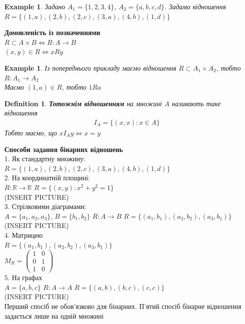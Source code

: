 \documentclass[a4paper, 14pt]{extarticle}
\theoremstyle{theoremdd}
\theoremstyle{theoremdd}
\newtheorem{definition}[theorem]{Definition}
\theoremstyle{theoremdd}
\theoremstyle{theoremdd}
\newtheorem{example}[theorem]{Example}
\theoremstyle{theoremdd}
\theoremstyle{theoremdd}
\theoremstyle{theoremdd}
\theoremstyle{theoremdd}
\begin{document}
\begin{example}
Задано $A_1 = \{1,2,3,4\}$, $A_2 = \{a,b,c,d\}$. Задамо відношення\\
$R = \{(1,a), (2,b), (2,c), (3,a), (4,b), (1,d) \}$
\end{example}

\textbf{Домовленість із позначеннями}\\
$R \subset A \times B \iff R: A \to B$\\
$(x,y) \in R \iff xRy$

\begin{example}
Із попереднього прикладу маємо відношення $R \subset A_1 \times A_2$, тобто $R: A_1 \to A_2$\\
Маємо $(1,a) \in R$, тобто $1Ra$
\end{example}

\begin{definition}
\textbf{Тотожнім відношенням} на множині $A$ називають таке відношення
\begin{align*}
I_A = \{(x,x): x \in A\}
\end{align*}
Тобто маємо, що $xI_A y \iff x = y$
\end{definition}

\textbf{Способи задання бінарних відношень}\\
1. Як стандартну множину: \\ $R = \{(1,a), (2,b), (2,c), (3,a), (4,b), (1,d)\}$\\
2. На координатній площині: \\
$R: \mathbb{R} \to \mathbb{R}$ \hspace{0.5cm} $R = \{(x,y): x^2+y^2 = 1 \}$\\
(INSERT PICTURE)\\
3. Стрілковими діаграмами: \\
$A = \{a_1,a_2,a_3\}$, $B = \{b_1,b_2\}$ \hspace{0.5cm} $R: A \to B$ \hspace{0.5cm} $R = \{(a_1,b_1), (a_2,b_2), (a_3,b_1)\}$\\
(INSERT PICTURE)\\
4. Матрицею \\
$R = \{(a_1,b_1), (a_2,b_2), (a_3,b_1)\}$\\
$M_{R} = \begin{pmatrix}
1 & 0 \\
0 & 1 \\
1 & 0
\end{pmatrix}$\\
5. На графах\\
$A = \{a,b,c\}$ \hspace{0.5cm} $R: A \to A$ \hspace{0.5cm} $R = \{(a,b), (b,c), (c,c)\}$\\
(INSERT PICTURE)
\bigskip \\
Перший спосіб не обов'язково для бінарних. П'ятий спосіб бінарне відношення задається лише на одній множині
\end{document}
